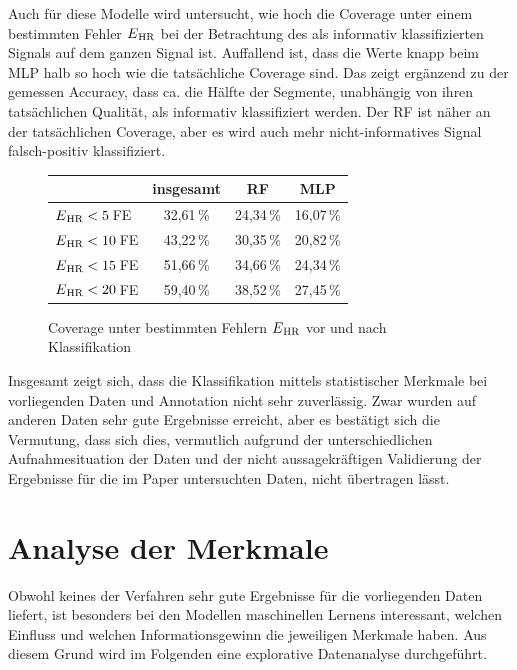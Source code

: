  Auch für diese Modelle wird untersucht, wie hoch die Coverage unter einem bestimmten Fehler $E\textsubscript{HR}$ bei der Betrachtung des als informativ klassifizierten Signals auf dem ganzen Signal ist. Auffallend ist, dass die Werte knapp beim \ac{MLP} halb so hoch wie die tatsächliche Coverage sind. Das zeigt ergänzend zu der gemessen Accuracy, dass ca. die Hälfte der Segmente, unabhängig von ihren tatsächlichen Qualität, als informativ klassifiziert werden. Der \ac{RF} ist näher an der tatsächlichen Coverage, aber es wird auch mehr nicht-informatives Signal falsch-positiv klassifiziert.
 
  \begin{figure}[H]
 	\centering
  	\begin{tabular}{l || c | c | c}
 											& insgesamt 		& RF			& MLP\\\hline
 		$E\textsubscript{HR} < 5$\,\si{FE} 	&  32{,}61\,\% 	& 24,34\,\%	& 16,07\,\%	\\
 		$E\textsubscript{HR} < 10$\,\si{FE} 	&  43{,}22\,\% 	& 30,35\,\% 	& 20,82\,\%	\\
 		$E\textsubscript{HR} < 15$\,\si{FE} 	&  51{,}66\,\% 	& 34,66\,\% 	& 24,34\,\%	\\
 		$E\textsubscript{HR} < 20$\,\si{FE} 	&  59{,}40\,\% 	& 38,52\,\% 	& 27,45\,\%\\
 	\end{tabular}
 	\caption[Coverage unter bestimmten Fehlern $E\textsubscript{HR}$ vor und nach Klassifikation]{Coverage unter bestimmten Fehlern $E\textsubscript{HR}$ vor und nach Klassifikation}
 	\label{fig:ml-statistical-coverage}
 \end{figure}
 
 Insgesamt zeigt sich, dass die Klassifikation mittels statistischer Merkmale bei vorliegenden Daten und Annotation nicht sehr zuverlässig. Zwar wurden auf anderen Daten sehr gute Ergebnisse erreicht, aber es bestätigt sich die Vermutung, dass sich dies, vermutlich aufgrund der unterschiedlichen Aufnahmesituation der Daten und der nicht aussagekräftigen Validierung der Ergebnisse für die im Paper untersuchten Daten, nicht übertragen lässt. 
 
\section{Analyse der Merkmale}

Obwohl keines der Verfahren sehr gute Ergebnisse für die vorliegenden Daten liefert, ist besonders bei den Modellen maschinellen Lernens interessant, welchen Einfluss und welchen Informationsgewinn die jeweiligen Merkmale haben. Aus diesem Grund wird im Folgenden eine explorative Datenanalyse durchgeführt.

